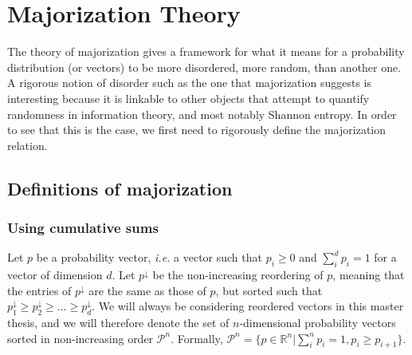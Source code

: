 \chapter{Majorization Theory}

The theory of majorization gives a framework for what it means for a probability distribution (or vectors) to be more disordered, more random, than another one. A rigorous notion of disorder such as the one that majorization suggests is interesting because it is linkable to other objects that attempt to quantify randomness in information theory, and most notably Shannon entropy. In order to see that this is the case, we first need to rigorously define the majorization relation.



\section{Definitions of majorization}

\subsection{Using cumulative sums}

Let $p$ be a probability vector, \textit{i.e.} a vector such that $p_i \geq 0$ and $\sum_{i}^{d} p_i = 1$ for a vector of dimension $d$. Let $p^\downarrow$ be the non-increasing reordering of $p$, meaning that the entries of $p^\downarrow$ are the same as those of $p$, but sorted such that $p^\downarrow_1 \geq p^\downarrow_2 \geq ... \geq p^\downarrow_d$. We will always be considering reordered vectors in this master thesis, and we will therefore denote the set of $n$-dimensional probability vectors sorted in non-increasing order $\mathcal{P}^n$. Formally, $\mathcal{P}^n = \{p \in \mathbb{R}^n | \sum_{i}^{n} p_i = 1, p_i \geq p_{i+1}\}$.

